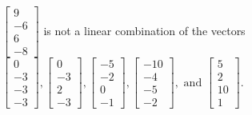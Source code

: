 \begin{exercise}
\begin{exerciseStatement}
  \end{exerciseStatement}
  \begin{exerciseAnswer}
   \(\left[\begin{array}{c}
9 \\
-6 \\
6 \\
-8
\end{array}\right]\) 
  	 is not  
	a linear combination of the vectors \(\left[\begin{array}{c}
0 \\
-3 \\
-3 \\
-3
\end{array}\right] , \left[\begin{array}{c}
0 \\
-3 \\
2 \\
-3
\end{array}\right] , \left[\begin{array}{c}
-5 \\
-2 \\
0 \\
-1
\end{array}\right] , \left[\begin{array}{c}
-10 \\
-4 \\
-5 \\
-2
\end{array}\right] , \text{ and } \left[\begin{array}{c}
5 \\
2 \\
10 \\
1
\end{array}\right]\).

	
  


  \end{exerciseAnswer}
\end{exercise}